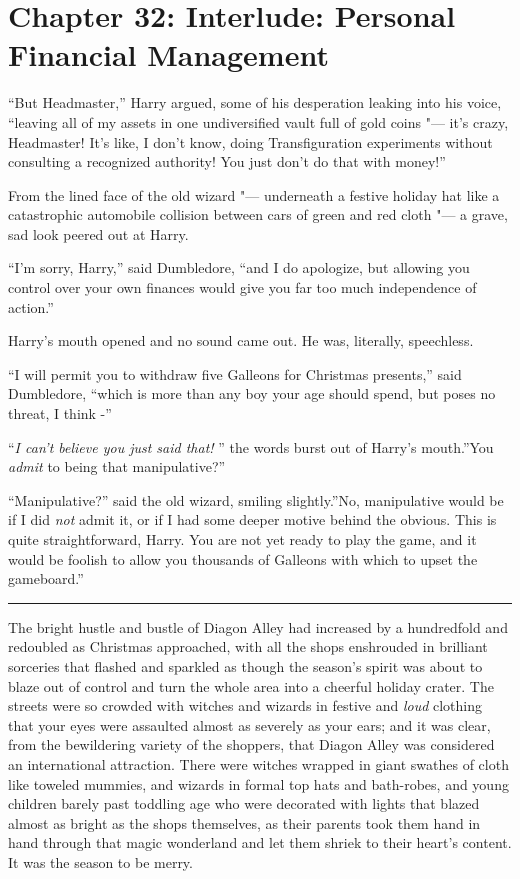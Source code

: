 \chapter{Chapter 32: Interlude: Personal Financial Management}
``But Headmaster,'' Harry argued, some of his desperation leaking into
his voice, ``leaving all of my assets in one undiversified vault full of
gold coins "--- it's crazy, Headmaster! It's like, I don't know, doing
Transfiguration experiments without consulting a recognized authority!
You just don't do that with money!''

From the lined face of the old wizard "--- underneath a festive holiday hat
like a catastrophic automobile collision between cars of green and red
cloth "--- a grave, sad look peered out at Harry.

``I'm sorry, Harry,'' said Dumbledore, ``and I do apologize, but
allowing you control over your own finances would give you far too much
independence of action.''

Harry's mouth opened and no sound came out. He was, literally,
speechless.

``I will permit you to withdraw five Galleons for Christmas presents,''
said Dumbledore, ``which is more than any boy your age should spend, but
poses no threat, I think -''

``\emph{I can't believe you just said that!} '' the words burst out of
Harry's mouth.''You \emph{admit} to being that manipulative?''

``Manipulative?'' said the old wizard, smiling slightly.''No,
manipulative would be if I did \emph{not} admit it, or if I had some
deeper motive behind the obvious. This is quite straightforward, Harry.
You are not yet ready to play the game, and it would be foolish to allow
you thousands of Galleons with which to upset the gameboard.''

\begin{center}\rule{3in}{0.4pt}\end{center}

The bright hustle and bustle of Diagon Alley had increased by a
hundredfold and redoubled as Christmas approached, with all the shops
enshrouded in brilliant sorceries that flashed and sparkled as though
the season's spirit was about to blaze out of control and turn the whole
area into a cheerful holiday crater. The streets were so crowded with
witches and wizards in festive and \emph{loud} clothing that your eyes
were assaulted almost as severely as your ears; and it was clear, from
the bewildering variety of the shoppers, that Diagon Alley was
considered an international attraction. There were witches wrapped in
giant swathes of cloth like toweled mummies, and wizards in formal top
hats and bath-robes, and young children barely past toddling age who
were decorated with lights that blazed almost as bright as the shops
themselves, as their parents took them hand in hand through that magic
wonderland and let them shriek to their heart's content. It was the
season to be merry.

